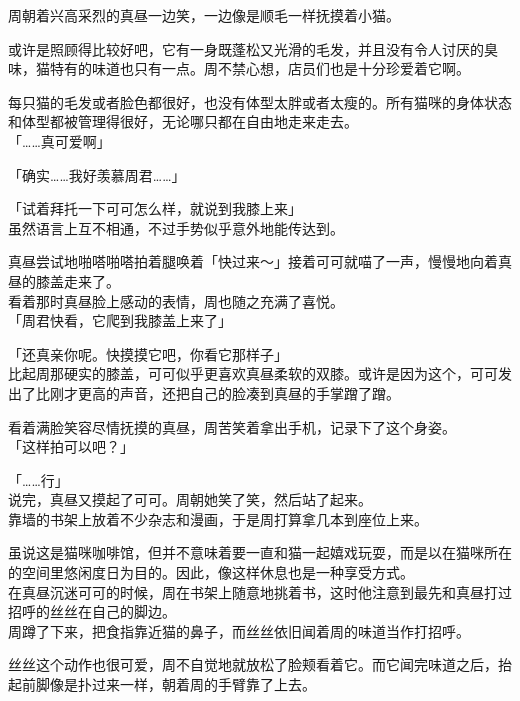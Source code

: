 周朝着兴高采烈的真昼一边笑，一边像是顺毛一样抚摸着小猫。

或许是照顾得比较好吧，它有一身既蓬松又光滑的毛发，并且没有令人讨厌的臭味，猫特有的味道也只有一点。周不禁心想，店员们也是十分珍爱着它啊。

每只猫的毛发或者脸色都很好，也没有体型太胖或者太瘦的。所有猫咪的身体状态和体型都被管理得很好，无论哪只都在自由地走来走去。\\

「……真可爱啊」

「确实……我好羡慕周君……」

「试着拜托一下可可怎么样，就说到我膝上来」\\

虽然语言上互不相通，不过手势似乎意外地能传达到。

真昼尝试地啪嗒啪嗒拍着腿唤着「快过来～」接着可可就喵了一声，慢慢地向着真昼的膝盖走来了。\\

看着那时真昼脸上感动的表情，周也随之充满了喜悦。\\

「周君快看，它爬到我膝盖上来了」

「还真亲你呢。快摸摸它吧，你看它那样子」\\

比起周那硬实的膝盖，可可似乎更喜欢真昼柔软的双膝。或许是因为这个，可可发出了比刚才更高的声音，还把自己的脸凑到真昼的手掌蹭了蹭。

看着满脸笑容尽情抚摸的真昼，周苦笑着拿出手机，记录下了这个身姿。\\

「这样拍可以吧？」

「……行」\\

说完，真昼又摸起了可可。周朝她笑了笑，然后站了起来。\\

靠墙的书架上放着不少杂志和漫画，于是周打算拿几本到座位上来。

虽说这是猫咪咖啡馆，但并不意味着要一直和猫一起嬉戏玩耍，而是以在猫咪所在的空间里悠闲度日为目的。因此，像这样休息也是一种享受方式。\\

在真昼沉迷可可的时候，周在书架上随意地挑着书，这时他注意到最先和真昼打过招呼的丝丝在自己的脚边。\\

周蹲了下来，把食指靠近猫的鼻子，而丝丝依旧闻着周的味道当作打招呼。

丝丝这个动作也很可爱，周不自觉地就放松了脸颊看着它。而它闻完味道之后，抬起前脚像是扑过来一样，朝着周的手臂靠了上去。\\

